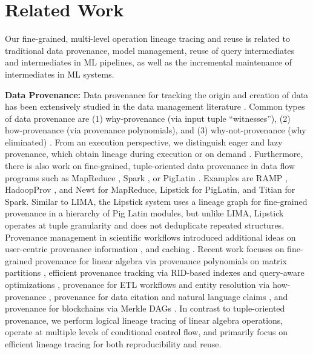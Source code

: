 
\section{Related Work}
\label{sec:related}

Our fine-grained, multi-level operation lineage tracing and reuse is related to traditional data provenance, model management, reuse of query intermediates and intermediates in ML pipelines, as well as the incremental maintenance of intermediates in ML systems.

\textbf{Data Provenance:} Data provenance for tracking the origin and creation of data has been extensively studied in the data management literature \cite{GlavicD07,CheneyCT09,Tan07}. Common types of data provenance are (1) why-provenance \cite{BunemanKT01,CuiWW00} (via input tuple ``witnesses''), (2) how-provenance \cite{GreenKIT07,GreenKT07} (via provenance polynomials), and (3) why-not-provenance (why eliminated) \cite{ChapmanJ09}. From an execution perspective, we distinguish eager and lazy provenance, which obtain lineage during execution or on demand \cite{CheneyCT09,PsallidasW18}. Furthermore, there is also work on fine-grained, tuple-oriented data provenance in data flow programs such as MapReduce \cite{DeanG04}, Spark \cite{ZahariaCDDMMFSS12}, or PigLatin \cite{OlstonRSKT08}. Examples are RAMP \cite{IkedaPW11}, HadoopProv \cite{AkoushSH13}, and Newt \cite{LogothetisDY13} for MapReduce, Lipstick \cite{AmsterdamerDDMST11} for PigLatin, and Titian \cite{InterlandiSTGYK15} for Spark. Similar to LIMA, the Lipstick system \cite{AmsterdamerDDMST11} uses a lineage graph for fine-grained provenance in a hierarchy of Pig Latin modules, but unlike LIMA, Lipstick operates at tuple granularity and does not deduplicate repeated structures. Provenance management in scientific workflows introduced additional ideas on user-centric provenance information \cite{DavidsonBELMBAF07, AnandBML09, LudascherABHJJLTZ06}, and caching \cite{BavoilCSVCSF05,CallahanFSSSV06}. Recent work focuses on fine-grained provenance for linear algebra via provenance polynomials on matrix partitions \cite{YanTI16}, efficient provenance tracking via RID-based indexes and query-aware optimizations \cite{PsallidasW18}, provenance for ETL workflows and entity resolution via how-provenance \cite{ZhengAI19}, provenance for data citation \cite{WuADMD19} and natural language claims \cite{ZhangIR20}, and provenance for blockchains via Merkle DAGs \cite{Ruan0DLOZ19}. In contrast to tuple-oriented provenance, we perform logical lineage tracing of linear algebra operations, operate at multiple levels of conditional control flow, and primarily focus on efficient lineage tracing for both reproducibility and reuse.

